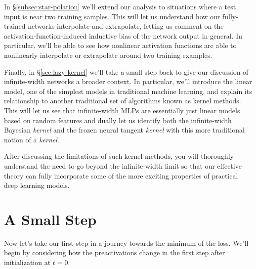In \S\ref{subsec:star-polation} we'll extend our analysis to situations where a test input is near two training samples. This will let us understand how our fully-trained networks interpolate and extrapolate, letting us comment  on the activation-function-induced inductive bias of the network output in general. In particular, we'll be able to see how nonlinear activation functions are able to nonlinearly interpolate or extrapolate around two training examples.


Finally, in \S\ref{sec:lazy-kernel} we'll take a small step back to give our discussion of infinite-width networks a broader context. In particular, we'll introduce the linear model, one of the simplest models in traditional machine learning, and explain its relationship to another traditional set of algorithms known as kernel methods. This will let us see that infinite-width MLPs are essentially just linear models based on random features and dually let us identify both the infinite-width Bayesian \emph{kernel} and the frozen neural tangent \emph{kernel} with this more traditional notion of a \emph{kernel}.

After discussing the limitations of such kernel methods, you will thoroughly understand the need to go beyond the infinite-width limit so that our effective theory can fully incorporate some of the more exciting properties of practical deep learning models.
























\section{A Small Step}\label{sec:small-step}
Now let's take our first step in a journey towards the minimum of the loss. We'll begin by considering how the preactivations change in the first step after initialization at $t=0$. 

